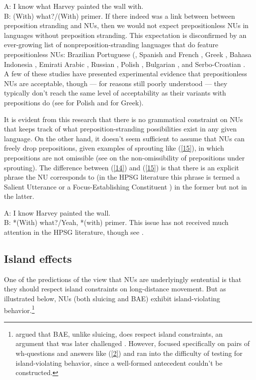 \documentclass[output=paper
                ,modfonts
                ,nonflat
	        ,collection
	        ,collectionchapter
	        ,collectiontoclongg
 	        ,biblatex
                ,babelshorthands
                ,newtxmath
                ,draftmode
                ,colorlinks, citecolor=brown
]{./langsci/langscibook}
\begin{document}
{\ea A: I know what Harvey painted the wall with.\\B: (With) what?/(With) primer.\label{14}\z
If there indeed was a link between between preposition stranding and NUs, then we would not expect prepositionless NUs in languages without preposition stranding. This expectation is disconfirmed by an ever-growing list of nonpreposition-stranding languages that do feature prepositionless NUs: Brazilian Portuguese (\citep{AlmeidaYoshida2007}, Spanish and French \citep{Rodrigues2006}, Greek \citep{Molimpakis2018}, Bahasa Indonesia \citep{Fortin2007}, Emirati Arabic \citep{Leung2014}, Russian \citep{Philippova2014}, Polish \citep{Szczegielniak2008, Nykiel2013, Sag2011}, %
Bulgarian \citep{Abels2017}, and Serbo-Croatian \citep{Stjepanovic2008, Stjepanovic2012}. A few of these studies have presented experimental evidence that prepositionless NUs are acceptable, though --- for reasons still poorly understood --- they typically don't reach the same level of acceptability as their variants with prepositions do (see \citealt{Nykiel2013} for Polish and \citealt{Molimpakis2018} for Greek).

It is evident from this research that there is no grammatical constraint on NUs that keeps track of what preposition-stranding possibilities exist in any given language. On the other hand, it doesn't seem sufficient to assume that NUs can freely drop prepositions, given examples of sprouting like (\ref{15}), in which prepositions are not omissible (see \citealt{Chung1995} on the non-omissibility of prepositions under sprouting). The difference between (\ref{14}) and (\ref{15}) is that there is an explicit phrase the NU corresponds to (in the HPSG literature this phrase is termed a Salient Utterance \citep{Ginzburg:Sag:2000} or a Focus-Establishing Constituent \citep{Ginzburg2012}) in the former but not in the latter.

\ea A: I know Harvey painted the wall.\\B: *(With) what?/Yeah, *(with) primer.\label{15}\z
This issue has not received much attention in the HPSG literature, though see \citet{Kim2015}.


\subsection{Island effects}
One of the predictions of the view that NUs are underlyingly sentential is that they should respect island constraints on long-distance movement. But as illustrated below, NUs (both sluicing and BAE) exhibit island-violating behavior.\footnote{\citet{Merchant2005a} argued that BAE, unlike sluicing, does respect island constraints, an argument that was later challenged \citep[see e.g,][]{CJ2005a, Griffiths2014}. However, \citet{Merchant2005-proc} focused specifically on pairs of wh-questions and answers like (\ref{2}) and ran into the difficulty of testing for island-violating behavior, since a well-formed antecedent couldn't be constructed.}

}
\end{document}
